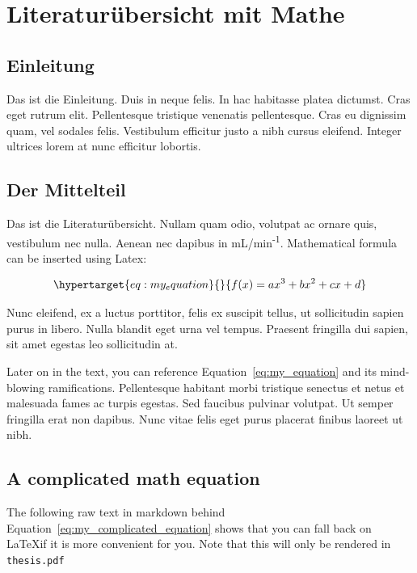 \documentclass[listof=totoc,index=totoc,bibliography=totoc,12pt,german,a4paper,]{report}
\begin{document}
\chapter{Literaturübersicht mit Mathe}\label{sec:lit-review}

\section{Einleitung}\label{einleitung}

Das ist die Einleitung. Duis in neque felis. In hac habitasse platea
dictumst. Cras eget rutrum elit. Pellentesque tristique venenatis
pellentesque. Cras eu dignissim quam, vel sodales felis. Vestibulum
efficitur justo a nibh cursus eleifend. Integer ultrices lorem at nunc
efficitur lobortis.

\section{Der Mittelteil}\label{der-mittelteil-1}

Das ist die Literaturübersicht. Nullam quam odio, volutpat ac ornare
quis, vestibulum nec nulla. Aenean nec dapibus in
mL/min\textsuperscript{-1}. Mathematical formula can be inserted using
Latex:

\begin{equation}\protect\hypertarget{eq:my_equation}{}{f(x) = ax^3 + bx^2 + cx + d}\label{eq:my_equation}\end{equation}

Nunc eleifend, ex a luctus porttitor, felis ex suscipit tellus, ut
sollicitudin sapien purus in libero. Nulla blandit eget urna vel tempus.
Praesent fringilla dui sapien, sit amet egestas leo sollicitudin at.

Later on in the text, you can reference Equation~\ref{eq:my_equation}
and its mind-blowing ramifications. Pellentesque habitant morbi
tristique senectus et netus et malesuada fames ac turpis egestas. Sed
faucibus pulvinar volutpat. Ut semper fringilla erat non dapibus. Nunc
vitae felis eget purus placerat finibus laoreet ut nibh.

\section{A complicated math equation}\label{a-complicated-math-equation}

The following raw text in markdown behind
Equation~\ref{eq:my_complicated_equation} shows that you can fall back
on \LaTeX if it is more convenient for you. Note that this will only be
rendered in \texttt{thesis.pdf}
\end{document}
